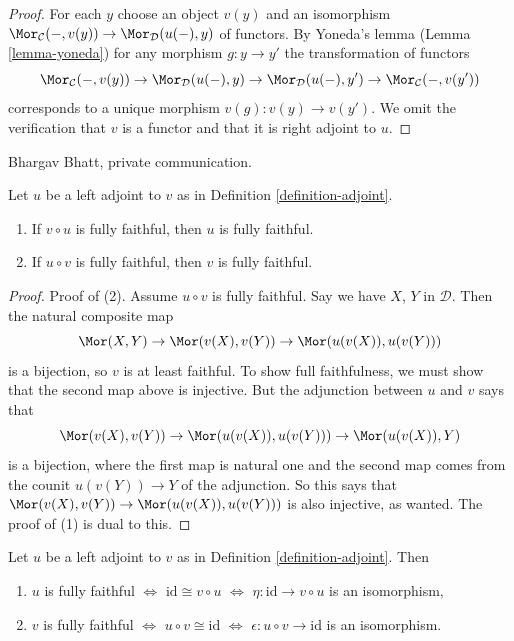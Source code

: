\begin{proof}
For each $y$ choose an object $v(y)$ and an isomorphism
$\Mor_\mathcal{C}(-, v(y)) \to \Mor_\mathcal{D}(u(-), y)$
of functors. By Yoneda's lemma (Lemma \ref{lemma-yoneda})
for any morphism $g : y \to y'$ the transformation of functors
$$
\Mor_\mathcal{C}(-, v(y)) \to \Mor_\mathcal{D}(u(-), y) \to
\Mor_\mathcal{D}(u(-), y') \to \Mor_\mathcal{C}(-, v(y'))
$$
corresponds to a unique morphism $v(g) : v(y) \to v(y')$.
We omit the verification that $v$ is a functor and that
it is right adjoint to $u$.
\end{proof}

\begin{lemma}
\label{lemma-left-adjoint-composed-fully-faithful}
\begin{reference}
Bhargav Bhatt, private communication.
\end{reference}
Let $u$ be a left adjoint to $v$ as in Definition \ref{definition-adjoint}.
\begin{enumerate}
\item If $v \circ u$ is fully faithful, then $u$ is fully faithful.
\item If $u \circ v$ is fully faithful, then $v$ is fully faithful.
\end{enumerate}
\end{lemma}

\begin{proof}
Proof of (2). Assume $u \circ v$ is fully faithful.
Say we have $X$, $Y$ in $\mathcal{D}$.
Then the natural composite map
$$
\Mor(X,Y) \to \Mor(v(X),v(Y)) \to \Mor(u(v(X)), u(v(Y)))
$$
is a bijection, so $v$ is at least faithful. To show full faithfulness,
we must show that the second map above is injective.
But the adjunction between $u$ and $v$ says that
$$
\Mor(v(X), v(Y)) \to \Mor(u(v(X)), u(v(Y))) \to \Mor(u(v(X)), Y)
$$
is a bijection, where the first map is natural one and
the second map comes from the counit $u(v(Y)) \to Y$ of the adjunction.
So this says that
$\Mor(v(X), v(Y)) \to \Mor(u(v(X)), u(v(Y)))$
is also injective, as wanted. The proof of (1) is dual to this.
\end{proof}

\begin{lemma}
\label{lemma-adjoint-fully-faithful}
Let $u$ be a left adjoint to $v$ as in Definition \ref{definition-adjoint}.
Then
\begin{enumerate}
\item $u$ is fully faithful $\Leftrightarrow$ $\text{id} \cong v \circ u$
$\Leftrightarrow$ $\eta : \text{id} \to v \circ u$ is an isomorphism,
\item $v$ is fully faithful $\Leftrightarrow$
$u \circ v \cong \text{id}$ $\Leftrightarrow$
$\epsilon : u \circ v \to \text{id}$ is an isomorphism.
\end{enumerate}
\end{lemma}

